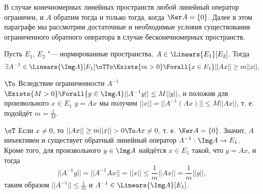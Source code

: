 \documentclass[main]{subfiles}
\begin{document}
В случае конечномерных линейных пространств
любой линейный оператор ограничен,
и \( A \) обратим тогда и только тогда,
когда \( \Ker A = \{ 0 \} \).
Далее в этом параграфе мы рассмотрим
достаточные и необходимые условия
существования ограниченного обратного оператора
в случае бесконечномерных пространств.

\begin{theorem}\label{thm:inverse-crit}
  Пусть \( E_1 \), \( E_2 \) "---
  нормированные пространства,
  \( A \in \Linears{E_1}[E_2] \).
  Тогда
  \[
    \exists A^{-1} \in \Linears{\Img A}[E_1] \oTTo
    \Exists{m > 0} \Forall{x \in E_1} ||Ax|| \ge m ||x||.
  \]
\end{theorem}
\begin{itemproof}
\item [\( \To \)]
  Вследствие ограниченности \( A^{-1} \)
  \( \Exists{M > 0} \Forall{y \in \Img A} ||A^{-1} y|| \le M||y|| \),
  и положив для произвольного \( x \in E_1 \) \( y = Ax \)
  мы получим \( ||x|| = ||A^{-1} (A x)|| \le M ||Ax|| \),
  т. е. подойдёт \( m = \frac{1}{M} \).
\item[\( \oT \)] %
  Если \( x \ne 0 \), то \( ||Ax|| \ge m ||x|| > 0 \To Ax \ne 0 \),
  т. е. \( \Ker A = \{ 0 \} \).
  Значит, \( A \) инъективен и существует
  обратный линейный оператор \( A^{-1} : \Img A \to E_1 \).
  Кроме того, для произвольного \( y \in \Img A \)
  найдётся \( x \in E_1 \) такой, что \( y = Ax \),
  и тогда
  \[
    ||A^{-1} y|| = ||A^{-1} A x|| = ||x|| \le
    \frac{1}{m} ||Ax|| = \frac1m ||y||,
  \]
  таким образом \( ||A^{-1}|| \le \frac{1}{m} \)
  и \( A^{-1} \in \Linears{\Img A}[E_1] \).
\end{itemproof}
\end{document}
